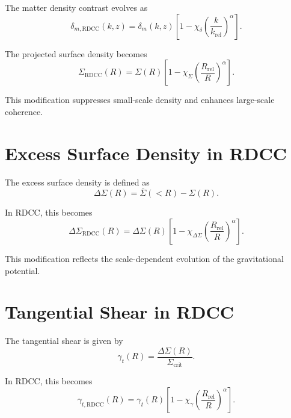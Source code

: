 \documentclass[11pt,a4paper]{article}
\begin{document}
The matter density contrast evolves as
\begin{equation}
    \delta_{m,\mathrm{RDCC}}(k,z)
    = \delta_{m}(k,z)
      \left[
        1 - \chi_{\delta}
        \left(\frac{k}{k_{\mathrm{rel}}}\right)^{\alpha}
      \right].
\end{equation}

The projected surface density becomes
\begin{equation}
    \Sigma_{\mathrm{RDCC}}(R)
    = \Sigma(R)
      \left[
        1 - \chi_{\Sigma}
        \left(\frac{R_{\mathrm{rel}}}{R}\right)^{\alpha}
      \right].
\end{equation}

This modification suppresses small-scale density and enhances large-scale 
coherence.
\section{Excess Surface Density in RDCC}

The excess surface density is defined as
\begin{equation}
    \Delta\Sigma(R)
    = \bar{\Sigma}(<R) - \Sigma(R).
\end{equation}

In RDCC, this becomes
\begin{equation}
    \Delta\Sigma_{\mathrm{RDCC}}(R)
    = \Delta\Sigma(R)
      \left[
        1 - \chi_{\Delta\Sigma}
        \left(\frac{R_{\mathrm{rel}}}{R}\right)^{\alpha}
      \right].
\end{equation}

This modification reflects the scale-dependent evolution of the gravitational 
potential.
\section{Tangential Shear in RDCC}

The tangential shear is given by
\begin{equation}
    \gamma_{t}(R)
    = \frac{\Delta\Sigma(R)}{\Sigma_{\mathrm{crit}}}.
\end{equation}

In RDCC, this becomes
\begin{equation}
    \gamma_{t,\mathrm{RDCC}}(R)
    = \gamma_{t}(R)
      \left[
        1 - \chi_{\gamma}
        \left(\frac{R_{\mathrm{rel}}}{R}\right)^{\alpha}
      \right].
\end{equation}
\end{document}
